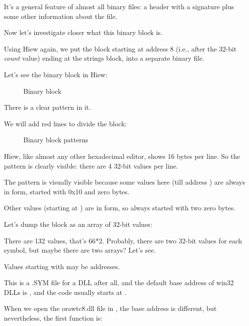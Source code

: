 It's a general feature of almost all binary files: a header with a signature plus some other information 
about the file.

Now let's investigate closer what this binary block is.

Using Hiew again, we put the block starting at address 8 (i.e., after the 32-bit \emph{count} value) 
ending at the strings block, into a separate binary file.

\clearpage
Let's see the binary block in Hiew:

\begin{figure}[H]
\centering
{}
\caption{Binary block}
\label{fig:oracle_SYM_binary1}
\end{figure}

There is a clear pattern in it. 

\clearpage
We will add red lines to divide the block: 

\begin{figure}[H]
\centering
{}
\caption{Binary block patterns}
\label{fig:oracle_SYM_binary2}
\end{figure}

Hiew, like almost any other hexadecimal editor, shows 16 bytes per line.
So the pattern is clearly visible: 
there are 4 32-bit values per line.

The pattern is visually visible because some values here (till address ) 
are always in  form, 
started with 0x10 and zero bytes.

Other values (starting at ) are in  form, so always started with two zero bytes.

Let's dump the block as an array of 32-bit values:



There are 132 values, that's 66*2.
Probably, there are two 32-bit values for each symbol, but maybe there are two arrays? 
Let's see.

Values starting with  may be addresses.

This is a .SYM file for a DLL after all, and the default base address of
win32 DLLs is , and the code usually starts at .

When we open the orawtc8.dll file in \IDA, the base address is different, but nevertheless, the first function is:

